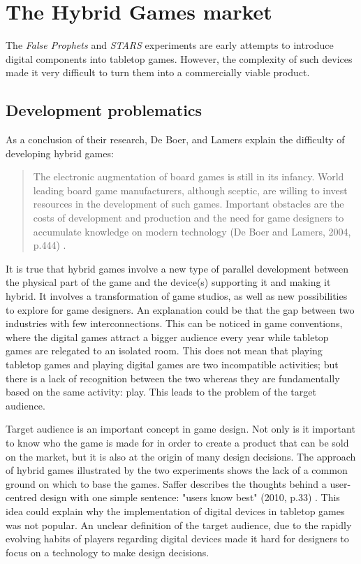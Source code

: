\section{The Hybrid Games market}
The \textit{False Prophets} and \textit{STARS} experiments are early attempts to introduce digital components into tabletop games. However, the complexity of such devices made it very difficult to turn them into a commercially viable product. 

\subsection{Development problematics}
As a conclusion of their research, De Boer, and Lamers explain the difficulty of developing hybrid games:

\begin{quotation}
The electronic augmentation of board games is still in its infancy. World leading board game manufacturers, although sceptic, are willing to invest resources in the development of such games. Important obstacles are the costs of development and production and the need for game designers to accumulate knowledge on modern technology (De Boer and Lamers, 2004, p.444) \cite{chap:aug}.
\end{quotation}

It is true that hybrid games involve a new type of parallel development between the physical part of the game and the device(s) supporting it and making it hybrid. It involves a transformation of game studios, as well as new possibilities to explore for game designers. An explanation could be that the gap between two industries with few interconnections. This can be noticed in game conventions, where the digital games attract a bigger audience every year while tabletop games are relegated to an isolated room. This does not mean that playing tabletop games and playing digital games are two incompatible activities; but there is a lack of recognition between the two whereas they are fundamentally based on the same activity: play. This leads to the problem of the target audience.

Target audience is an important concept in game design. Not only is it important to know who the game is made for in order to create a product that can be sold on the market, but it is also at the origin of many design decisions. The approach of hybrid games illustrated by the two experiments shows the lack of a common ground on which to base the games. Saffer describes the thoughts behind a user-centred design with one simple sentence: "users know best" (2010, p.33) \cite{book:id}. This idea could explain why the implementation of digital devices in tabletop games was not popular.  An unclear definition of the target audience, due to the rapidly evolving habits of players regarding digital devices made it hard for designers to focus on a technology to make design decisions.


